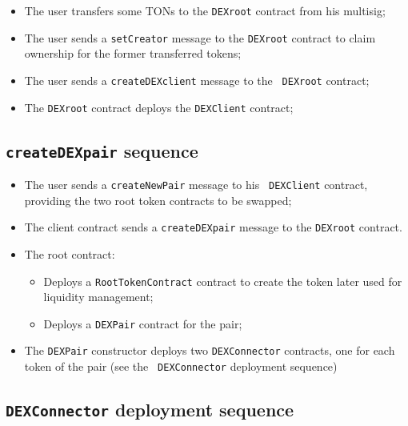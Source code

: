 \begin{itemize}
\item The user transfers some TONs to the {\tt DEXroot} contract from
  his multisig;
\item The user sends a {\tt setCreator} message to the {\tt DEXroot}
  contract to claim ownership for the former transferred tokens;
\item The user sends a {\tt createDEXclient} message to the {\tt
  DEXroot} contract;
\item The {\tt DEXroot} contract deploys the {\tt DEXClient} contract;
\end{itemize}

\subsection{{\tt createDEXpair} sequence}

\begin{itemize}
\item The user sends a {\tt createNewPair} message to his {\tt
  DEXClient} contract, providing the two root token contracts to be
  swapped;
\item The client contract sends a {\tt createDEXpair} message to the
  {\tt DEXroot} contract.
\item The root contract:
  \begin{itemize}
  \item Deploys a {\tt RootTokenContract} contract to create the
    token later used for liquidity management;
  \item Deploys a {\tt DEXPair} contract for the pair;
  \end{itemize}
\item The {\tt DEXPair} constructor deploys two {\tt DEXConnector}
  contracts, one for each token of the pair (see the {\tt
    DEXConnector} deployment sequence)
\end{itemize}

\subsection{{\tt DEXConnector} deployment sequence}


